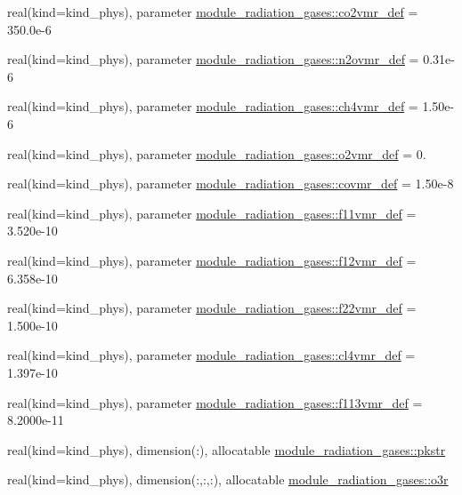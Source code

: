 \begin{DoxyCompactItemize}
\item 
real(kind=kind\+\_\+phys), parameter \hyperlink{group__module__radiation__gases_ga4fb5ca2e3bfaed7848d7602a22499e76}{module\+\_\+radiation\+\_\+gases\+::co2vmr\+\_\+def} = 350.\+0e-\/6
\item 
real(kind=kind\+\_\+phys), parameter \hyperlink{group__module__radiation__gases_ga858ad802efe755f8b4b5bde85996b6ae}{module\+\_\+radiation\+\_\+gases\+::n2ovmr\+\_\+def} = 0.\+31e-\/6
\item 
real(kind=kind\+\_\+phys), parameter \hyperlink{group__module__radiation__gases_gaad928d9e0064905a0b6e1eb8bb59bd23}{module\+\_\+radiation\+\_\+gases\+::ch4vmr\+\_\+def} = 1.\+50e-\/6
\item 
real(kind=kind\+\_\+phys), parameter \hyperlink{group__module__radiation__gases_ga910898e96b8afe92ebc82ce62ba682d8}{module\+\_\+radiation\+\_\+gases\+::o2vmr\+\_\+def} = 0.
\item 
real(kind=kind\+\_\+phys), parameter \hyperlink{group__module__radiation__gases_ga3554bdf03f8222d425bb6c946244cbb5}{module\+\_\+radiation\+\_\+gases\+::covmr\+\_\+def} = 1.\+50e-\/8
\item 
real(kind=kind\+\_\+phys), parameter \hyperlink{group__module__radiation__gases_ga23ae6bb6860bfefef0c281b7106f521e}{module\+\_\+radiation\+\_\+gases\+::f11vmr\+\_\+def} = 3.\+520e-\/10
\item 
real(kind=kind\+\_\+phys), parameter \hyperlink{group__module__radiation__gases_ga96d4f78070f30010626e0824b3421250}{module\+\_\+radiation\+\_\+gases\+::f12vmr\+\_\+def} = 6.\+358e-\/10
\item 
real(kind=kind\+\_\+phys), parameter \hyperlink{group__module__radiation__gases_gafd0018e96811ac64ef2abd8cab821eb5}{module\+\_\+radiation\+\_\+gases\+::f22vmr\+\_\+def} = 1.\+500e-\/10
\item 
real(kind=kind\+\_\+phys), parameter \hyperlink{group__module__radiation__gases_ga013f8faaee6df0c7c032e1786770c110}{module\+\_\+radiation\+\_\+gases\+::cl4vmr\+\_\+def} = 1.\+397e-\/10
\item 
real(kind=kind\+\_\+phys), parameter \hyperlink{group__module__radiation__gases_ga76ec88dc6284c48cfaae6cd05428b6dd}{module\+\_\+radiation\+\_\+gases\+::f113vmr\+\_\+def} = 8.\+2000e-\/11
\item 
real(kind=kind\+\_\+phys), dimension(\+:), allocatable \hyperlink{group__module__radiation__gases_gac7466def3963591ebfc48298806b1f6a}{module\+\_\+radiation\+\_\+gases\+::pkstr}
\item 
real(kind=kind\+\_\+phys), dimension(\+:,\+:,\+:), allocatable \hyperlink{group__module__radiation__gases_gad18392d991a9ef4b6ff0e8e822176a18}{module\+\_\+radiation\+\_\+gases\+::o3r}

\end{DoxyCompactItemize}

